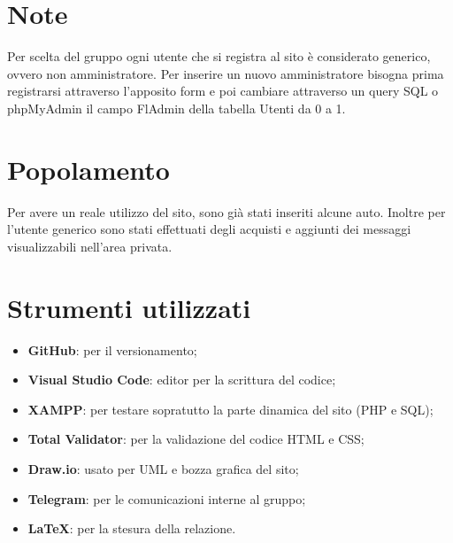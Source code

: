 \appendix
    \section{Note}
    Per scelta del gruppo ogni utente che si registra al sito è considerato generico, ovvero non amministratore. Per inserire un nuovo amministratore bisogna prima registrarsi attraverso l'apposito form e poi cambiare attraverso un query SQL o phpMyAdmin il campo FlAdmin della tabella Utenti da 0 a 1.

    \section{Popolamento}
    Per avere un reale utilizzo del sito, sono già stati inseriti alcune auto. Inoltre per l'utente generico sono stati effettuati degli acquisti e aggiunti dei messaggi visualizzabili nell'area privata.

    \section{Strumenti utilizzati}
    \begin{itemize}
        \item \textbf{GitHub}: per il versionamento; 
        \item \textbf{Visual Studio Code}: editor per la scrittura del codice; 
        \item \textbf{XAMPP}: per testare sopratutto la parte dinamica del sito (PHP e SQL);
        \item \textbf{Total Validator}: per la validazione del codice HTML e CSS;
        \item \textbf{Draw.io}: usato per UML e bozza grafica del sito;
        \item \textbf{Telegram}: per le comunicazioni interne al gruppo;
        \item \textbf{\LaTeX}: per la stesura della relazione.
    \end{itemize}
\pagebreak